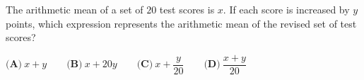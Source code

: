 The arithmetic mean of a set of $20$ test scores is $x$. If each score is increased by $y$ points, which expression represents the arithmetic mean of the revised set of test scores?

$\textbf{(A)}\ x+y\qquad\textbf{(B)}\ x+20y\qquad\textbf{(C)}\ x+\dfrac{y}{20}\qquad\textbf{(D)}\ \dfrac{x+y}{20}$
